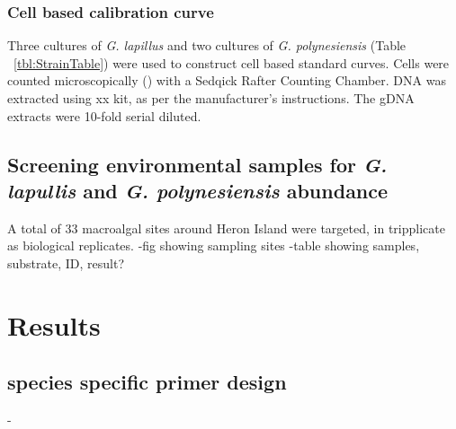 \documentclass[12pt]{article}
\begin{document}
\subsubsection{Cell based calibration curve}
Three cultures of \emph{G. lapillus} and two cultures of \emph{G. polynesiensis} (Table ~\ref{tbl:StrainTable}) were used to construct cell based standard curves. Cells were counted microscopically () with a Sedqick Rafter Counting Chamber. DNA was extracted using xx kit, as per the manufacturer's instructions. The gDNA extracts were 10-fold serial diluted.



\subsection{Screening environmental samples for \emph{G. lapullis} and \emph{G. polynesiensis} abundance}
A total of 33 macroalgal sites around Heron Island were targeted, in tripplicate as biological replicates.
-fig showing sampling sites
-table showing samples, substrate, ID, result? 

\newpage
\section{Results}
\subsection{species specific primer design}
-
\end{document}
